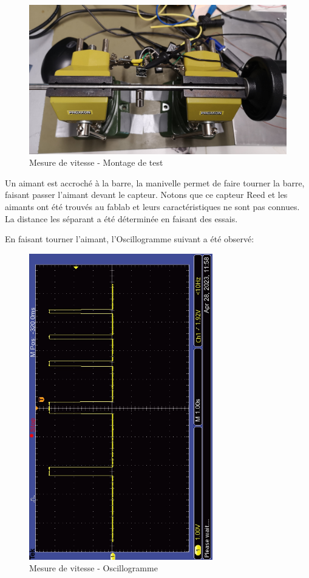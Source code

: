 \begin{figure}[H]
    \centering
    \includegraphics[width=12cm]{assets/figures/essieu.jpg}
    \caption{Mesure de vitesse - Montage de test}
\end{figure}
Un aimant est accroché à la barre, la manivelle permet de faire tourner la barre, faisant passer l'aimant devant le capteur.
Notons que ce capteur Reed et les aimants ont été trouvés au \gls{fablab} et leurs caractéristiques ne sont pas connues. La distance les
séparant a été déterminée en faisant des essais.

En faisant tourner l'aimant, l'Oscillogramme suivant a été observé:
\begin{figure}[H]
    \centering
    \includegraphics[width=8cm, angle=-90]{assets/figures/trame_comp.JPG}
    \caption{Mesure de vitesse - Oscillogramme}
\end{figure}

